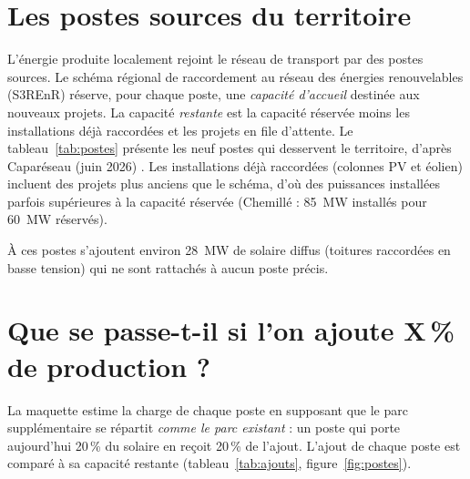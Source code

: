 \documentclass[11pt, a4paper]{report}
\newcommand{\pct}{\,\%}
\begin{document}

\section{Les postes sources du territoire}

L'énergie produite localement rejoint le réseau de transport par des postes sources. Le schéma régional de raccordement au réseau des énergies renouvelables (S3REnR) réserve, pour chaque poste, une \emph{capacité d'accueil} destinée aux nouveaux projets. La capacité \emph{restante} est la capacité réservée moins les installations déjà raccordées et les projets en file d'attente. Le tableau~\ref{tab:postes} présente les neuf postes qui desservent le territoire, d'après Caparéseau (juin 2026) \cite{capareseau}. Les installations déjà raccordées (colonnes PV et éolien) incluent des projets plus anciens que le schéma, d'où des puissances installées parfois supérieures à la capacité réservée (Chemillé : 85~MW installés pour 60~MW réservés).


À ces postes s'ajoutent environ 28~MW de solaire diffus (toitures raccordées en basse tension) qui ne sont rattachés à aucun poste précis.

\section{Que se passe-t-il si l'on ajoute X\pct{} de production ?}

La maquette estime la charge de chaque poste en supposant que le parc supplémentaire se répartit \emph{comme le parc existant} : un poste qui porte aujourd'hui 20\pct{} du solaire en reçoit 20\pct{} de l'ajout. L'ajout de chaque poste est comparé à sa capacité restante (tableau~\ref{tab:ajouts}, figure~\ref{fig:postes}).

\end{document}
